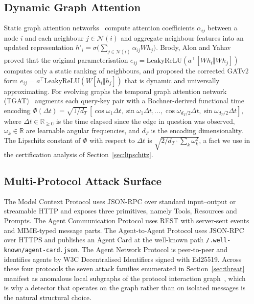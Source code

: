 \documentclass{ieeeaccess}
\newcommand{\R}{\mathbb{R}}
\newcommand{\calN}{\mathcal{N}}
\begin{document}
\subsection{Dynamic Graph Attention}
Static graph attention networks~\cite{Velickovic2018GAT} compute attention coefficients $\alpha_{ij}$ between a node $i$ and each neighbour $j\in\calN(i)$ and aggregate neighbour features into an updated representation $h'_{i}=\sigma\bigl(\sum_{j\in\calN(i)}\alpha_{ij}Wh_{j}\bigr)$. Brody, Alon and Yahav~\cite{Brody2022GATv2} proved that the original parameterisation $e_{ij}=\mathrm{LeakyReLU}(a^{\top}[Wh_{i}\Vert Wh_{j}])$ computes only a static ranking of neighbours, and proposed the corrected GATv2 form $e_{ij}=a^{\top}\mathrm{LeakyReLU}(W[h_{i}\Vert h_{j}])$ that is dynamic and universally approximating. For evolving graphs the temporal graph attention network (TGAT)~\cite{Xu2020TGAT} augments each query-key pair with a Bochner-derived functional time encoding $\Phi(\Delta t)=\sqrt{1/d_{T}}\,[\cos\omega_{1}\Delta t,\sin\omega_{1}\Delta t,\ldots,\cos\omega_{d_{T}/2}\Delta t,\sin\omega_{d_{T}/2}\Delta t]$, where $\Delta t\in\R_{\ge 0}$ is the time elapsed since the edge in question was observed, $\omega_{k}\in\R$ are learnable angular frequencies, and $d_{T}$ is the encoding dimensionality. The Lipschitz constant of $\Phi$ with respect to $\Delta t$ is $\sqrt{2/d_{T}\cdot\sum_{k}\omega_{k}^{2}}$, a fact we use in the certification analysis of Section~\ref{sec:lipschitz}.

\subsection{Multi-Protocol Attack Surface}
The Model Context Protocol uses JSON-RPC over standard input--output or streamable HTTP and exposes three primitives, namely Tools, Resources and Prompts. The Agent Communication Protocol uses REST with server-sent events and MIME-typed message parts. The Agent-to-Agent Protocol uses JSON-RPC over HTTPS and publishes an Agent Card at the well-known path \texttt{/.well-known/agent-card.json}. The Agent Network Protocol is peer-to-peer and identifies agents by W3C Decentralised Identifiers signed with Ed25519. Across these four protocols the seven attack families enumerated in Section~\ref{sec:threat} manifest as anomalous local subgraphs of the protocol interaction graph~\cite{Hou2025MCP,Habler2025A2A,Narajala2025A2A,Wang2025AgentArmor}, which is why a detector that operates on the graph rather than on isolated messages is the natural structural choice.
\end{document}
